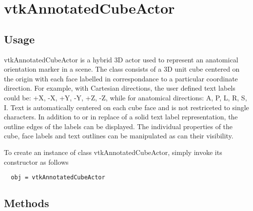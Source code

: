 \section{vtkAnnotatedCubeActor}

\subsection{Usage}

 vtkAnnotatedCubeActor is a hybrid 3D actor used to represent an anatomical
 orientation marker in a scene.  The class consists of a 3D unit cube centered
 on the origin with each face labelled in correspondance to a particular
 coordinate direction.  For example, with Cartesian directions, the user
 defined text labels could be: +X, -X, +Y, -Y, +Z, -Z, while for anatomical
 directions: A, P, L, R, S, I.  Text is automatically centered on each cube
 face and is not restriceted to single characters. In addition to or in
 replace of a solid text label representation, the outline edges of the labels
 can be displayed.  The individual properties of the cube, face labels
 and text outlines can be manipulated as can their visibility.

To create an instance of class vtkAnnotatedCubeActor, simply
invoke its constructor as follows
\begin{verbatim}
  obj = vtkAnnotatedCubeActor
\end{verbatim}
\subsection{Methods}

